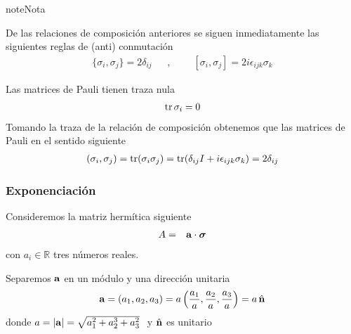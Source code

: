 \documentclass[letterpaper,10pt,english]{jupyterBook}
\begin{document}
\begin{sphinxadmonition}{note}{Nota}

\sphinxAtStartPar
De las relaciones de composición anteriores se siguen inmediatamente las siguientes reglas de (anti) conmutación
\begin{equation*}
\begin{split}
\{\sigma_i,\sigma_j \} = 2\delta_{ij}~~~~~~~,~~~~~~~
~~~[\sigma_i,\sigma_j] = 2i\epsilon_{ijk}\sigma_k
\end{split}
\end{equation*}\end{sphinxadmonition}

\sphinxAtStartPar
Las matrices de Pauli tienen traza nula
\begin{equation*}
\begin{split}
{\rm tr} \, \sigma_i = 0
\end{split}
\end{equation*}
\sphinxAtStartPar
Tomando la traza de la relación de composición obtenemos que las matrices de Pauli  en el sentido siguiente
\begin{equation*}
\begin{split}
(\sigma_i, \sigma_j) = {\rm tr}(\sigma_i\sigma_j) = {\rm tr}(\delta_{ij}I + i\epsilon_{ijk}  \sigma_k) = 2\delta_{ij}
\end{split}
\end{equation*}

\subsubsection{Exponenciación}
\label{\detokenize{docs/Part_01_Formalismo/Chapter_01_02_Formalismo_matem_xe1tico/01_03_Operadores_myst:exponenciacion}}
\sphinxAtStartPar
Consideremos  la  matriz hermítica siguiente
\begin{eqnarray*}
A &=& {\bf a} \cdot \boldsymbol{\sigma} 
\end{eqnarray*}
\sphinxAtStartPar
con \(a_i\in {\mathbb R}\) tres números reales.

\sphinxAtStartPar
Separemos \({\bf a}\) en un módulo y una dirección unitaria
\begin{equation*}
\begin{split}{\bf a} = (a_1,a_2,a_3) =a \left( \frac{a_1}{a},\frac{a_2}{a},\frac{a_3}{a}\right) =  a\, \hat{\bf n}\end{split}
\end{equation*}
\sphinxAtStartPar
donde \(a=|{\bf a}|=\sqrt{a_1^2+a_2^3+a_3^2}~\)  y \(\hat{\bf n}\) es unitario
\end{document}
